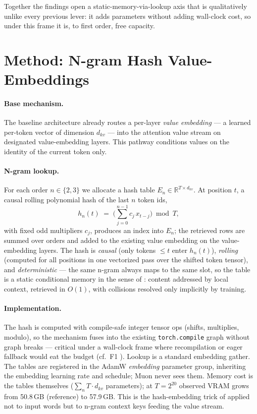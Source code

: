 \documentclass{article}
\begin{document}
Together the findings open a static-memory-via-lookup axis that is qualitatively unlike every previous lever: it adds parameters without adding wall-clock cost, so under this frame it is, to first order, free capacity.

\section{Method: N-gram Hash Value-Embeddings}
\label{sec:method}

\paragraph{Base mechanism.} The baseline architecture already routes a per-layer \emph{value embedding} --- a learned per-token vector of dimension $d_{kv}$ --- into the attention value stream on designated value-embedding layers. This pathway conditions values on the identity of the current token only.

\paragraph{N-gram lookup.} For each order $n \in \{2, 3\}$ we allocate a hash table $E_n \in \mathbb{R}^{T \times d_{kv}}$. At position $t$, a causal rolling polynomial hash of the last $n$ token ids,
\[
h_n(t) \;=\; \Big( \textstyle\sum_{j=0}^{n-1} c_j \, x_{t-j} \Big) \bmod T,
\]
with fixed odd multipliers $c_j$, produces an index into $E_n$; the retrieved rows are summed over orders and added to the existing value embedding on the value-embedding layers. The hash is \emph{causal} (only tokens $\leq t$ enter $h_n(t)$), \emph{rolling} (computed for all positions in one vectorized pass over the shifted token tensor), and \emph{deterministic} --- the same n-gram always maps to the same slot, so the table is a static conditional memory in the sense of \citet{engram2026}: content addressed by local context, retrieved in $O(1)$, with collisions resolved only implicitly by training.

\paragraph{Implementation.} The hash is computed with compile-safe integer tensor ops (shifts, multiplies, modulo), so the mechanism fuses into the existing \texttt{torch.compile} graph without graph breaks --- critical under a wall-clock frame where recompilation or eager fallback would eat the budget (cf.\ F1 \cite{ophis2026paper001}). Lookup is a standard embedding gather. The tables are registered in the AdamW \emph{embedding} parameter group, inheriting the embedding learning rate and schedule; Muon never sees them. Memory cost is the tables themselves ($\sum_n T \cdot d_{kv}$ parameters); at $T = 2^{20}$ observed VRAM grows from 50.8\,GB (reference) to 57.9\,GB. This is the hash-embedding trick of \citet{svenstrup2017hash} applied not to input words but to n-gram context keys feeding the value stream.
\end{document}
